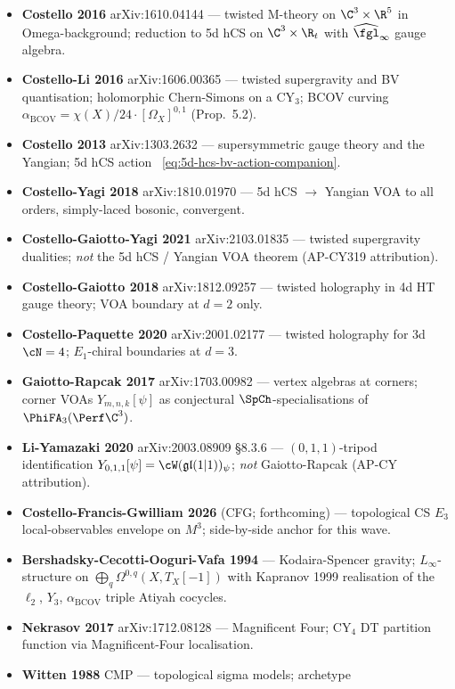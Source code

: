 \begin{itemize}
\item \textbf{Costello 2016} arXiv:1610.04144 --- twisted M-theory on
$\C^3 \times \R^5$ in Omega-background; reduction to 5d hCS on
$\C^3 \times \R_t$ with $\widehat{\fgl}_\infty$ gauge algebra.
\item \textbf{Costello-Li 2016} arXiv:1606.00365 --- twisted supergravity
and BV quantisation; holomorphic Chern-Simons on a CY$_3$; BCOV curving
$\alpha_{\mathrm{BCOV}} = \chi(X)/24 \cdot [\Omega_X]^{0,1}$ (Prop.~5.2).
\item \textbf{Costello 2013} arXiv:1303.2632 --- supersymmetric gauge
theory and the Yangian; 5d hCS action ~\eqref{eq:5d-hcs-bv-action-companion}.
\item \textbf{Costello-Yagi 2018} arXiv:1810.01970 --- 5d hCS $\to$
Yangian VOA to all orders, simply-laced bosonic, convergent.
\item \textbf{Costello-Gaiotto-Yagi 2021} arXiv:2103.01835 ---
twisted supergravity dualities; \emph{not} the 5d hCS / Yangian VOA
theorem (AP-CY319 attribution).
\item \textbf{Costello-Gaiotto 2018} arXiv:1812.09257 --- twisted
holography in 4d HT gauge theory; VOA boundary at $d = 2$ only.
\item \textbf{Costello-Paquette 2020} arXiv:2001.02177 --- twisted
holography for 3d $\cN = 4$; $E_1$-chiral boundaries at $d = 3$.
\item \textbf{Gaiotto-Rapcak 2017} arXiv:1703.00982 --- vertex algebras
at corners; corner VOAs $Y_{m, n, k}[\psi]$ as conjectural
$\SpCh$-specialisations of $\PhiFA_3(\Perf \C^3)$.
\item \textbf{Li-Yamazaki 2020} arXiv:2003.08909 \S8.3.6 ---
$(0, 1, 1)$-tripod identification $Y_{0, 1, 1}[\psi] = \cW(\mathfrak{gl}
(1|1))_\psi$; \emph{not} Gaiotto-Rapcak (AP-CY attribution).
\item \textbf{Costello-Francis-Gwilliam 2026} (CFG; forthcoming) ---
topological CS $E_3$ local-observables envelope on $M^3$; side-by-side
anchor for this wave.
\item \textbf{Bershadsky-Cecotti-Ooguri-Vafa 1994} ---
Kodaira-Spencer gravity; $L_\infty$-structure on $\bigoplus_q
\Omega^{0,q}(X, T_X[-1])$ with Kapranov 1999 realisation of the
$\ell_2$, $Y_3$, $\alpha_{\mathrm{BCOV}}$ triple Atiyah cocycles.
\item \textbf{Nekrasov 2017} arXiv:1712.08128 ---
Magnificent Four; CY$_4$ DT partition function via Magnificent-Four
localisation.
\item \textbf{Witten 1988} CMP --- topological sigma models; archetype

\end{itemize}
